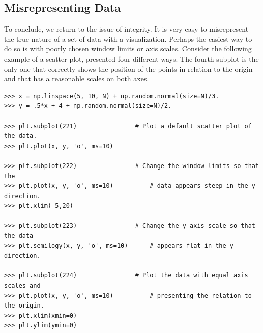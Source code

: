 \subsection*{Misrepresenting Data} %

To conclude, we return to the issue of integrity.
It is very easy to misrepresent the true nature of a set of data with a visualization.
Perhaps the easiest way to do so is with poorly chosen window limits or axis scales.
Consider the following example of a scatter plot, presented four different ways.
The fourth subplot is the only one that correctly shows the position of the points in relation to the origin and that has a reasonable scales on both axes.

\begin{lstlisting}
>>> x = np.linspace(5, 10, N) + np.random.normal(size=N)/3.
>>> y = .5*x + 4 + np.random.normal(size=N)/2.

>>> plt.subplot(221)                # Plot a default scatter plot of the data.
>>> plt.plot(x, y, 'o', ms=10)

>>> plt.subplot(222)                # Change the window limits so that the
>>> plt.plot(x, y, 'o', ms=10)          # data appears steep in the y direction.
>>> plt.xlim(-5,20)

>>> plt.subplot(223)                # Change the y-axis scale so that the data
>>> plt.semilogy(x, y, 'o', ms=10)      # appears flat in the y direction.

>>> plt.subplot(224)                # Plot the data with equal axis scales and
>>> plt.plot(x, y, 'o', ms=10)          # presenting the relation to the origin.
>>> plt.xlim(xmin=0)
>>> plt.ylim(ymin=0)
\end{lstlisting}

